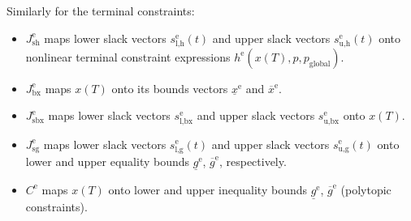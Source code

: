 \documentclass[english]{article}
\newcommand{\ind}[1]{_{\textrm{#1}}}
\newcommand{\terminal}{^{\textrm{e}}}
\newcommand{\glob}{_{\textrm{global}}}
\begin{document}
Similarly for the terminal constraints:
\begin{itemize}
	\item $J\ind{sh}\terminal$ maps lower slack vectors $s\ind{l,h}\terminal(t)$ and upper slack vectors $s\ind{u,h}\terminal(t)$ onto nonlinear terminal constraint expressions $h\terminal(x(T), p, p\glob)$.
	\item $J\ind{bx}\terminal$ maps $x(T)$ onto its bounds vectors $\underline{x}\terminal$ and $\overline{x}\terminal$.
	\item $J\ind{sbx}\terminal$ maps lower slack vectors $s\ind{l,bx}\terminal$ and upper slack vectors $s\ind{u,bx}\terminal$ onto $x(T)$.
	\item $J\ind{sg}\terminal$ maps lower slack vectors $s\ind{l,g}\terminal(t)$ and upper slack vectors $s\ind{u,g}\terminal(t)$ onto lower and upper equality bounds $\underline{g}\terminal$, $\overline{g}\terminal$, respectively.
	\item $C\terminal$ maps $x(T)$ onto lower and upper inequality bounds $\underline{g}\terminal$, $\overline{g}\terminal$ (polytopic constraints).
\end{itemize}
%
%
\end{document}
